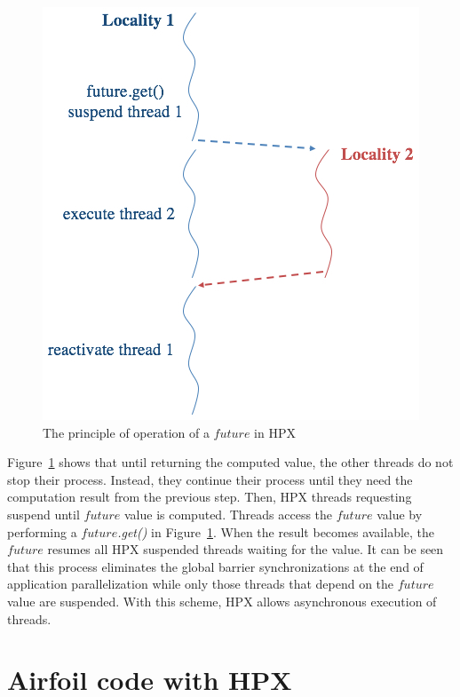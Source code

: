 \documentclass[conference]{IEEEtran}
\begin{document}
\begin{figure} [!h]
\captionsetup{justification=centering}
\begin{center}
\centering
\includegraphics[width=0.75\columnwidth]{Pictures/f4a.jpg}
\caption {The principle of operation of a \textit{$future$} in HPX}
\label{f4}
\end{center}
\end{figure}



Figure~\ref{f4} shows that until returning the computed value, the other threads do not stop their process. Instead, they continue their process until they need the computation result from the previous step. Then, HPX threads requesting suspend until $future$ value is computed. Threads access the $future$ value by performing a \textit{$future$.get()} in Figure~\ref{f4}. When the result becomes available, the \textit{$future$} resumes all HPX suspended threads waiting for the value. It can be seen that this process eliminates the global barrier synchronizations at the end of application parallelization while only those threads that depend on the $future$ value are suspended. With this scheme, HPX allows asynchronous execution of threads.


\section{Airfoil code with HPX}
\label{sec:air}
\end{document}
